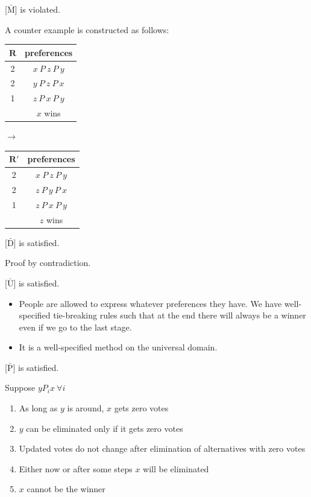 \documentclass[a4paper]{article}
\begin{document}
[$\mathrm{\bar{M}}$] is violated.

A counter example is constructed as follows:

\begin{table}[!htbp]
    \centering
    \begin{tabular}{c|c|}
        $\mathbf{R}$ & preferences         \\ 
        \hline
        2  & $x\: P\: z\: P\: y$ \\
        2  & $y\: P\: z\: P\: x$ \\
        1  & $z\: P\: x\: P\: y$ \\
        \hline 
           & $x$ wins
    \end{tabular}
    \qquad $\to$ \qquad
    \centering
    \begin{tabular}{c|c|}
        $\mathbf{R'}$ & preferences         \\ 
        \hline
        2  & $x\: P\: z\: P\: y$ \\
        2  & $z\: P\: y\: P\: x$ \\
        1  & $z\: P\: x\: P\: y$ \\
        \hline 
           & $z$ wins
    \end{tabular}
\end{table}

[$\mathrm{\bar{D}}$] is satisfied.

Proof by contradiction.

[$\mathrm{\bar{U}}$] is satisfied.

\begin{itemize}
    \item People are allowed to express whatever preferences they have. We have well-specified tie-breaking rules such that at the end there will always be a winner even if we go to the last stage.
    \item It is a well-specified method on the universal domain.
\end{itemize}

[$\mathrm{\bar{P}}$] is satisfied.

Suppose $yP_i x\:\forall i$
\begin{enumerate}
    \item As long as $y$ is around, $x$ gets zero votes
    \item $y$ can be eliminated only if it gets zero votes
    \item Updated votes do not change after elimination of alternatives with zero votes
    \item Either now or after some steps $x$ will be eliminated
    \item $x$ cannot be the winner
\end{enumerate}
\end{document}
